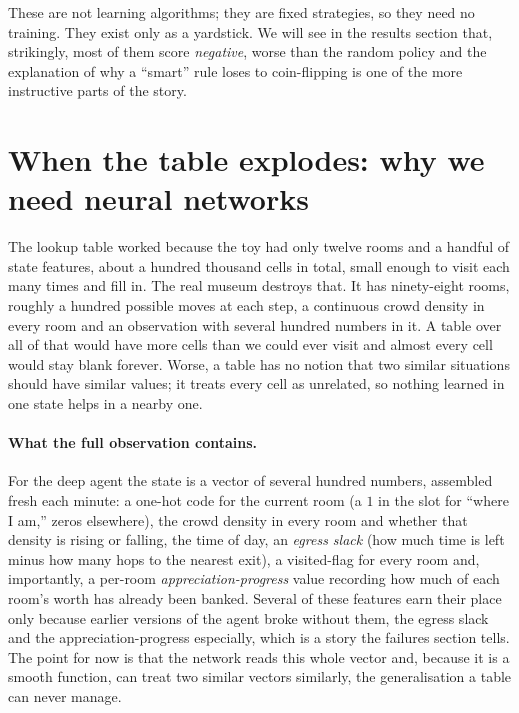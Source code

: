 \documentclass[11pt]{article}
\newcommand{\key}[1]{\textit{#1}}            %
\begin{document}
These are not learning algorithms; they are fixed strategies, so they need no training.
They exist only as a yardstick. We will see in the results section that, strikingly, most
of them score \emph{negative}, worse than the random policy and the explanation of why a
``smart'' rule loses to coin-flipping is one of the more instructive parts of the story.

\section{When the table explodes: why we need neural networks}

The lookup table worked because the toy had only twelve rooms and a handful of state
features, about a hundred thousand cells in total, small enough to visit each many times
and fill in. The real museum destroys that. It has ninety-eight rooms, roughly a hundred
possible moves at each step, a continuous crowd density in every room and an observation
with several hundred numbers in it. A table over all of that would have more cells than we
could ever visit and almost every cell would stay blank forever. Worse, a table has no
notion that two similar situations should have similar values; it treats every cell as
unrelated, so nothing learned in one state helps in a nearby one.

\paragraph{What the full observation contains.} For the deep agent the state is a vector of
several hundred numbers, assembled fresh each minute: a one-hot code for the current room
(a $1$ in the slot for ``where I am,'' zeros elsewhere), the crowd density in every room and
whether that density is rising or falling, the time of day, an \key{egress slack} (how much
time is left minus how many hops to the nearest exit), a visited-flag for every room and,
importantly, a per-room \key{appreciation-progress} value recording how much of each room's
worth has already been banked. Several of these features earn their place only because
earlier versions of the agent broke without them, the egress slack and the
appreciation-progress especially, which is a story the failures section tells. The point for
now is that the network reads this whole vector and, because it is a smooth function, can
treat two similar vectors similarly, the generalisation a table can never manage.
\end{document}
